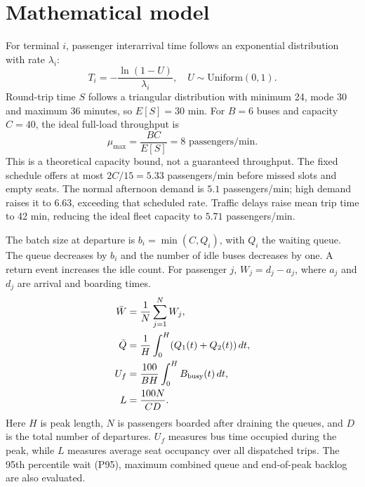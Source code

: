 \documentclass[conference]{IEEEtran}
\begin{document}
\section{Mathematical model}
For terminal $i$, passenger interarrival time follows an exponential distribution with rate $\lambda_i$:
\begin{equation} T_i=-\frac{\ln(1-U)}{\lambda_i},\quad U\sim\mathrm{Uniform}(0,1).\end{equation}
Round-trip time $S$ follows a triangular distribution with minimum 24, mode 30 and maximum 36 minutes, so $E[S]=30$ min. For $B=6$ buses and capacity $C=40$, the ideal full-load throughput is
\begin{equation} \mu_{\max}=\frac{BC}{E[S]}=8\text{ passengers/min}.\end{equation}
This is a theoretical capacity bound, not a guaranteed throughput. The fixed schedule offers at most $2C/15=5.33$ passengers/min before missed slots and empty seats. The normal afternoon demand is $5.1$ passengers/min; high demand raises it to $6.63$, exceeding that scheduled rate. Traffic delays raise mean trip time to 42 min, reducing the ideal fleet capacity to $5.71$ passengers/min.

The batch size at departure is $b_i=\min(C,Q_i)$, with $Q_i$ the waiting queue. The queue decreases by $b_i$ and the number of idle buses decreases by one. A return event increases the idle count. For passenger $j$, $W_j=d_j-a_j$, where $a_j$ and $d_j$ are arrival and boarding times.
\begin{align}
\bar W&=\frac{1}{N}\sum_{j=1}^{N}W_j,\\
\bar Q&=\frac{1}{H}\int_0^H (Q_1(t)+Q_2(t))\,dt,\\
U_f&=\frac{100}{BH}\int_0^H B_{\rm busy}(t)\,dt,\\
L&=\frac{100N}{C D}.
\end{align}
Here $H$ is peak length, $N$ is passengers boarded after draining the queues, and $D$ is the total number of departures. $U_f$ measures bus time occupied during the peak, while $L$ measures average seat occupancy over all dispatched trips. The 95th percentile wait (P95), maximum combined queue and end-of-peak backlog are also evaluated.
\end{document}
